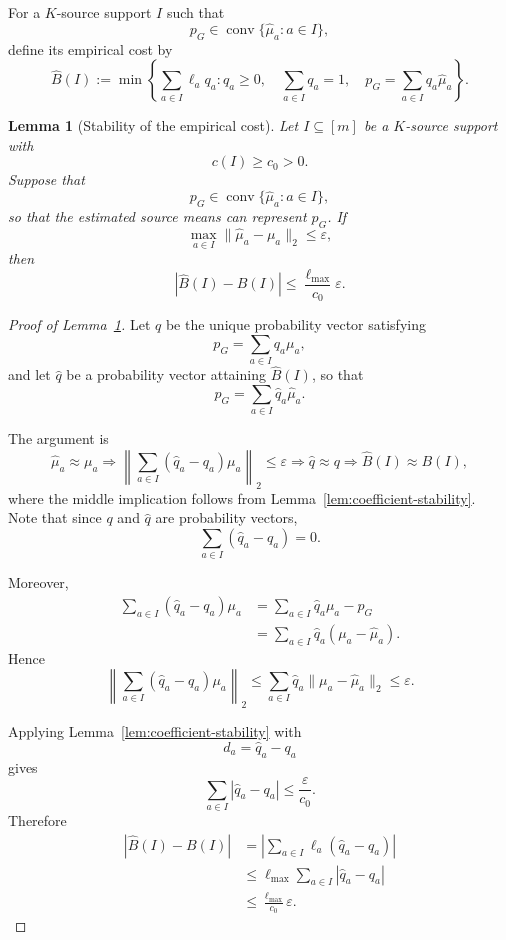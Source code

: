 \documentclass[twoside]{article}
\newtheorem{lemma}{Lemma}
\begin{document}

For a \(K\)-source support \(I\) such that
\[
p_G\in\operatorname{conv}\{\widehat\mu_a:a\in I\},
\]
define its empirical cost by
\[
\widehat B(I)
:=
\min\left\{
\sum_{a\in I}\ell_a q_a:
q_a\geq0,\quad
\sum_{a\in I}q_a=1,\quad
p_G=\sum_{a\in I}q_a\widehat\mu_a
\right\}.
\]

\begin{lemma}[Stability of the empirical cost]
\label{lem:cost-stability}
Let \(I\subseteq[m]\) be a \(K\)-source support with
\[
c(I)\geq c_0>0.
\]
Suppose that
\[
p_G\in
\operatorname{conv}\{\widehat\mu_a:a\in I\},
\]
so that the estimated source means can represent \(p_G\). If
\[
\max_{a\in I}
\|\widehat\mu_a-\mu_a\|_2
\leq
\varepsilon,
\]
then
\[
\left|
\widehat B(I)-B(I)
\right|
\leq
\frac{\ell_{\max}}{c_0}\varepsilon.
\]
\end{lemma}

\begin{proof}[Proof of Lemma~\ref{lem:cost-stability}] Let \(q\) be the unique probability vector satisfying
\[
p_G=\sum_{a\in I}q_a\mu_a,
\]
and let \(\widehat q\) be a probability vector attaining
\(\widehat B(I)\), so that
\[
p_G=\sum_{a\in I}\widehat q_a\widehat\mu_a.
\]

The argument is
\[
\widehat\mu_a\approx\mu_a
\Longrightarrow
\left\|
\sum_{a\in I}(\widehat q_a-q_a)\mu_a
\right\|_2
\leq
\varepsilon
\Longrightarrow
\widehat q\approx q
\Longrightarrow
\widehat B(I)\approx B(I),
\]
where the middle implication follows from
Lemma~\ref{lem:coefficient-stability}.\\

Note that since \(q\) and \(\widehat q\) are probability vectors,
\[
\sum_{a\in I}(\widehat q_a-q_a)=0.
\]

Moreover,
\[
\begin{aligned}
\sum_{a\in I}(\widehat q_a-q_a)\mu_a
&=
\sum_{a\in I}\widehat q_a\mu_a-p_G\\
&=
\sum_{a\in I}
\widehat q_a(\mu_a-\widehat\mu_a).
\end{aligned}
\]
Hence
\[
\left\|
\sum_{a\in I}(\widehat q_a-q_a)\mu_a
\right\|_2
\leq
\sum_{a\in I}
\widehat q_a\|\mu_a-\widehat\mu_a\|_2
\leq
\varepsilon.
\]

Applying Lemma~\ref{lem:coefficient-stability} with
\[
d_a=\widehat q_a-q_a
\]
gives
\[
\sum_{a\in I}
|\widehat q_a-q_a|
\leq
\frac{\varepsilon}{c_0}.
\]
Therefore
\[
\begin{aligned}
|\widehat B(I)-B(I)|
&=
\left|
\sum_{a\in I}\ell_a(\widehat q_a-q_a)
\right|\\
&\leq
\ell_{\max}
\sum_{a\in I}|\widehat q_a-q_a|\\
&\leq
\frac{\ell_{\max}}{c_0}\varepsilon.
\end{aligned}
\]
\end{proof}
\end{document}
